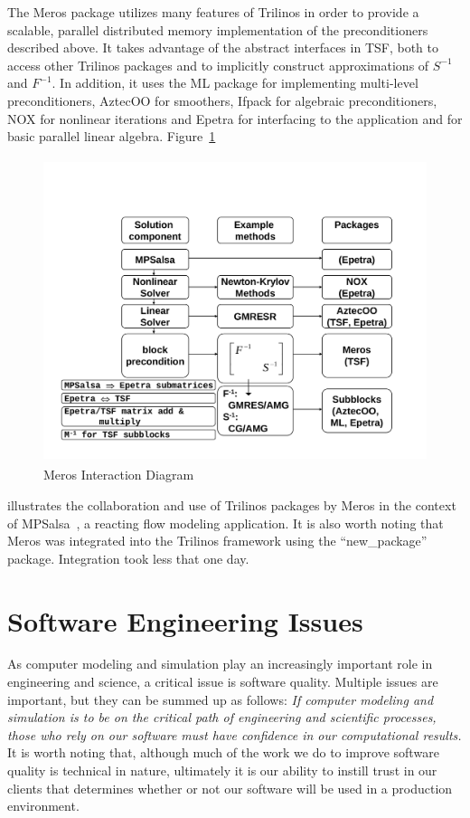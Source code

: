 \documentclass[12pt,relax]{TPA}
\begin{document}
The Meros package utilizes many features of Trilinos in order to
provide a scalable, parallel distributed memory implementation of the
preconditioners described above.  It takes advantage of the abstract
interfaces in TSF, both to access other Trilinos packages and to
implicitly construct approximations of $S^{-1}$ and $F^{-1}$.  In
addition, it uses
the ML package for implementing multi-level preconditioners, AztecOO
for smoothers, Ifpack for algebraic preconditioners, NOX for nonlinear
iterations and Epetra for
interfacing to the application and for basic parallel linear algebra.
Figure~\ref{Figure:MerosBlockDiagram} 
\begin{figure}
\begin{center}
\includegraphics[height=3.5in]{../CommonFiles/MerosBlockDiagram}
\end{center}
\caption{\label{Figure:MerosBlockDiagram}Meros Interaction Diagram}
\end{figure}
illustrates the collaboration and use of Trilinos packages by Meros
in the context of MPSalsa~\cite{MPSalsa-User-Guide}, a reacting flow modeling
application. It is also worth noting that Meros was integrated into
the Trilinos framework using the ``new\_package'' package.  Integration
took less that one day.


\section{Software Engineering Issues}
\label{sect:SQA}
As computer modeling and simulation play an increasingly important
role in engineering and science, a critical issue is software
quality.  Multiple issues are important, but they can be summed up as
follows: {\it If computer modeling and simulation is to be on the critical path 
of engineering and scientific processes, those who rely on our software must
 have confidence in our computational
results.}  It is worth noting that, although much of the work we do to
improve software quality is technical in nature, ultimately it is our
ability to instill trust in our clients that determines whether or not
our software will be used in a production environment.
\end{document}
